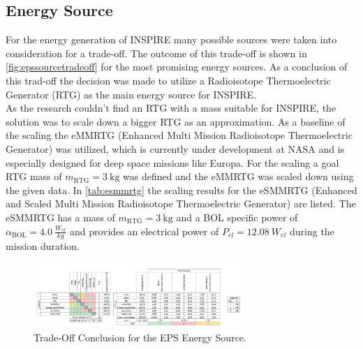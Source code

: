 \subsection{Energy Source}
For the energy generation of INSPIRE many possible sources were taken into consideration for a trade-off. The outcome of this trade-off is shown in \autoref{fig:epssourcetradeoff} for the most promising energy sources. As a conclusion of this trad-off the decision was made to utilize a Radioisotope Thermoelectric Generator (RTG) as the main energy source for INSPIRE. \\

As the research couldn't find an RTG with a mass suitable for INSPIRE, the solution was to scale down a bigger RTG as an approximation. As a baseline of the scaling the eMMRTG (Enhanced Multi Mission Radioisotope Thermoelectric Generator) was utilized, which is currently under development at NASA and is especially designed for deep space missions like Europa. For the scaling a goal RTG mass of $m_\text{RTG}=3 \ \text{kg}$ was defined and the eMMRTG was scaled down using the given data.
In \autoref{tab:esmmrtg} the scaling results for the eSMMRTG (Enhanced and Scaled Multi Mission Radioisotope Thermoelectric Generator) are listed. The eSMMRTG has a mass of $m_\text{RTG}=3 \ \text{kg}$ and a BOL specific power of $\alpha_\text{BOL}= 4.0 \ \frac{W_{el}}{kg}$ and provides an electrical power of $P_{el} = 12.08 \ W_{el}$ during the mission duration.



\begin{figure}[htb]
{\centering
\includegraphics[width=0.7\textwidth]{Media/epssourcetradeoff}
\caption{Trade-Off Conclusion for the EPS Energy Source.}
\label{fig:epssourcetradeoff}
}
\end{figure}

